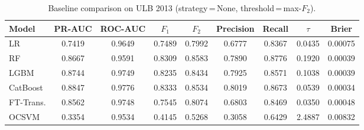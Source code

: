 \begin{table}[ht!]
\centering
\caption{Baseline comparison on ULB 2013 (strategy\,=\,None, threshold\,=\,max-$F_2$).}
\label{tab:baseline_ulb}
\begin{tabular}{l c c c c c c c c}
\toprule
Model & PR-AUC & ROC-AUC & $F_1$ & $F_2$ & Precision & Recall & $\tau$ & Brier \\
\midrule
LR         & 0.7419 & 0.9649 & 0.7489 & 0.7992 & 0.6777 & 0.8367 & 0.0435 & 0.00075 \\
RF         & 0.8667 & 0.9591 & 0.8309 & 0.8583 & 0.7890 & 0.8776 & 0.1920 & 0.00039 \\
LGBM       & 0.8744 & 0.9749 & 0.8235 & 0.8434 & 0.7925 & 0.8571 & 0.1038 & 0.00039 \\
CatBoost   & 0.8847 & 0.9776 & 0.8333 & 0.8534 & 0.8019 & 0.8673 & 0.0539 & 0.00034 \\
FT-Trans.  & 0.8562 & 0.9748 & 0.7545 & 0.8074 & 0.6803 & 0.8469 & 0.0350 & 0.00048 \\
OCSVM      & 0.3354 & 0.9534 & 0.4145 & 0.5268 & 0.3058 & 0.6429 & 2.4887 & 0.00832 \\
\bottomrule
\end{tabular}
\end{table}